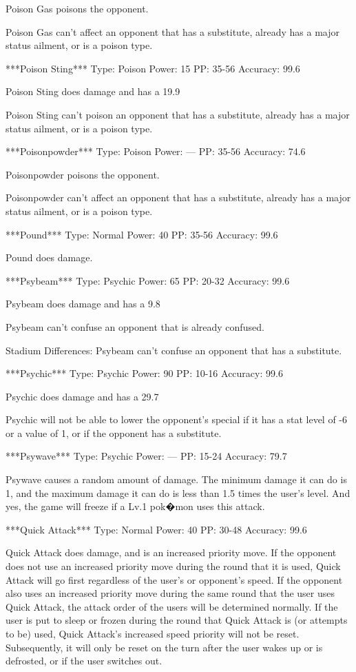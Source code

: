 \documentclass[reprint, aps, prl, paper=A4]{revtex4-1}
\begin{document}
Poison Gas poisons the opponent.

Poison Gas can't affect an opponent that has a substitute, already has a major status ailment,
or is a poison type.


***Poison Sting***
Type: Poison
Power: 15
PP: 35-56
Accuracy: 99.6%

Poison Sting does damage and has a 19.9%

Poison Sting can't poison an opponent that has a substitute, already has a major status
ailment, or is a poison type.


***Poisonpowder***
Type: Poison
Power: ---
PP: 35-56
Accuracy: 74.6%

Poisonpowder poisons the opponent.

Poisonpowder can't affect an opponent that has a substitute, already has a major status
ailment, or is a poison type.


***Pound***
Type: Normal
Power: 40
PP: 35-56
Accuracy: 99.6%

Pound does damage.


***Psybeam***
Type: Psychic
Power: 65
PP: 20-32
Accuracy: 99.6%

Psybeam does damage and has a 9.8%

Psybeam can't confuse an opponent that is already confused.

Stadium Differences:
Psybeam can't confuse an opponent that has a substitute.


***Psychic***
Type: Psychic
Power: 90
PP: 10-16
Accuracy: 99.6%

Psychic does damage and has a 29.7%

Psychic will not be able to lower the opponent's special if it has a stat level of -6 or a
value of 1, or if the opponent has a substitute.


***Psywave***
Type: Psychic
Power: ---
PP: 15-24
Accuracy: 79.7%

Psywave causes a random amount of damage. The minimum damage it can do is 1, and the maximum
damage it can do is less than 1.5 times the user's level. And yes, the game will freeze if a
Lv.1 pok�mon uses this attack.


***Quick Attack***
Type: Normal
Power: 40
PP: 30-48
Accuracy: 99.6%

Quick Attack does damage, and is an increased priority move. If the opponent does not use an
increased priority move during the round that it is used, Quick Attack will go first regardless
of the user's or opponent's speed. If the opponent also uses an increased priority move during
the same round that the user uses Quick Attack, the attack order of the users will be
determined normally. If the user is put to sleep or frozen during the round that Quick Attack
is (or attempts to be) used, Quick Attack's increased speed priority will not be reset.
Subsequently, it will only be reset on the turn after the user wakes up or is defrosted, or if
the user switches out.
\end{document}
